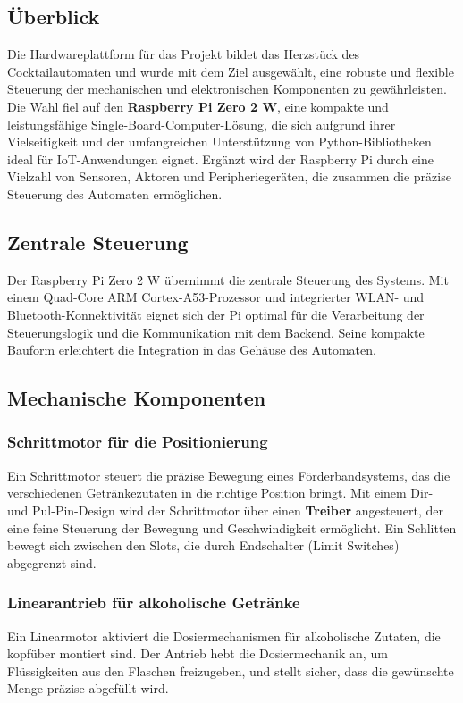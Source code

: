 \subsection{Überblick}
Die Hardwareplattform für das Projekt bildet das Herzstück des Cocktailautomaten und wurde mit dem Ziel ausgewählt, eine robuste und flexible Steuerung der mechanischen und elektronischen Komponenten zu gewährleisten. Die Wahl fiel auf den \textbf{Raspberry Pi Zero 2 W}, eine kompakte und leistungsfähige Single-Board-Computer-Lösung, die sich aufgrund ihrer Vielseitigkeit und der umfangreichen Unterstützung von Python-Bibliotheken ideal für IoT-Anwendungen eignet. Ergänzt wird der Raspberry Pi durch eine Vielzahl von Sensoren, Aktoren und Peripheriegeräten, die zusammen die präzise Steuerung des Automaten ermöglichen.

\subsection{Zentrale Steuerung}
Der Raspberry Pi Zero 2 W übernimmt die zentrale Steuerung des Systems. Mit einem Quad-Core ARM Cortex-A53-Prozessor und integrierter WLAN- und Bluetooth-Konnektivität eignet sich der Pi optimal für die Verarbeitung der Steuerungslogik und die Kommunikation mit dem Backend. Seine kompakte Bauform erleichtert die Integration in das Gehäuse des Automaten.

\subsection{Mechanische Komponenten}
\subsubsection{Schrittmotor für die Positionierung}
Ein Schrittmotor steuert die präzise Bewegung eines Förderbandsystems, das die verschiedenen Getränkezutaten in die richtige Position bringt. Mit einem Dir- und Pul-Pin-Design wird der Schrittmotor über einen \textbf{Treiber} angesteuert, der eine feine Steuerung der Bewegung und Geschwindigkeit ermöglicht. Ein Schlitten bewegt sich zwischen den Slots, die durch Endschalter (Limit Switches) abgegrenzt sind.

\subsubsection{Linearantrieb für alkoholische Getränke}
Ein Linearmotor aktiviert die Dosiermechanismen für alkoholische Zutaten, die kopfüber montiert sind. Der Antrieb hebt die Dosiermechanik an, um Flüssigkeiten aus den Flaschen freizugeben, und stellt sicher, dass die gewünschte Menge präzise abgefüllt wird.

